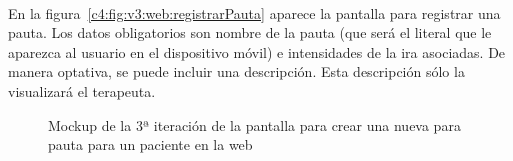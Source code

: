 \paragraph{}
En la figura~\ref{c4:fig:v3:web:registrarPauta} aparece la pantalla para registrar una pauta. Los datos obligatorios son nombre de la pauta (que será el literal que le aparezca al usuario en el dispositivo móvil) e intensidades de la ira asociadas. De manera optativa, se puede incluir una descripción. Esta descripción sólo la visualizará el terapeuta.

\begin{figure}[H]
    \centering
    \caption[Mockup de la 3ª iteración de la pantalla para crear una nueva para pauta para un paciente en la web]{Mockup de la 3ª iteración de la pantalla para crear una nueva para pauta para un paciente en la web}
    \label{c4:fig:v3:web:nuevaPautaPaciente}
\end{figure}

